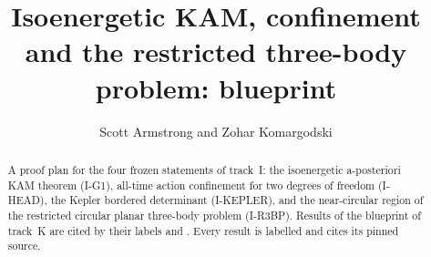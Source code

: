 \documentclass[11pt]{amsart}
\title{Isoenergetic KAM, confinement and the restricted three-body problem: blueprint}
\author{Scott Armstrong and Zohar Komargodski}
\begin{document}
\begin{abstract}
A proof plan for the four frozen statements of track~I: the isoenergetic a-posteriori KAM theorem
(I-G1), all-time action confinement for two degrees of freedom (I-HEAD), the Kepler bordered
determinant (I-KEPLER), and the near-circular region of the restricted circular planar three-body
problem (I-R3BP). Results of the blueprint of track~K are cited by their labels 
and . Every result is labelled and cites its pinned source.
\end{abstract}
\maketitle
\tableofcontents








\end{document}
